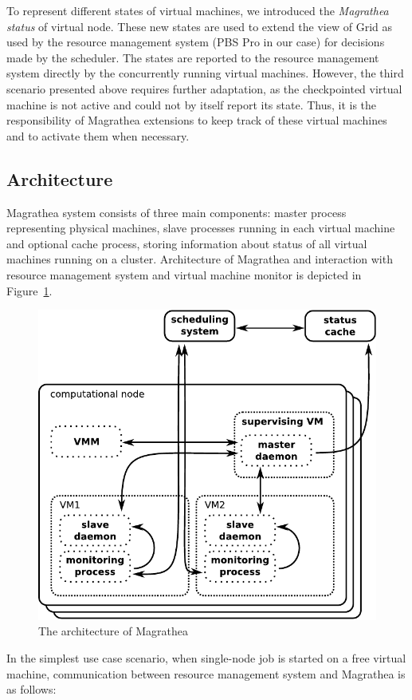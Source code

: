 \documentclass[a4paper]{article}
\begin{document}
To represent different states of virtual machines, we introduced the
\textit{Magrathea status} of virtual node. These new states are used to extend
the view of Grid as used by the resource management system (PBS Pro in our
case) for decisions made by the scheduler. The states are reported to the
resource management system directly by the concurrently running virtual
machines. However, the third scenario presented above requires further
adaptation, as the checkpointed virtual machine is not active and could not by
itself report its state. Thus, it is the responsibility of Magrathea
extensions to keep track of these virtual machines and to activate them when
necessary.

\subsection{Architecture} 

Magrathea system consists of three main components: master process
representing physical machines, slave processes running in each virtual
machine and optional cache process, storing information about status of all
virtual machines running on a cluster. Architecture of Magrathea and
interaction with resource management system and virtual machine monitor is
depicted in Figure~\ref{fig:architecture}.

\begin{figure}[tb]
    \begin{center}
    \includegraphics[width=.6\textwidth]{architecture}
    \end{center}
    \caption{The architecture of Magrathea}
    \label{fig:architecture}
\end{figure}

In the simplest use case scenario, when single-node job is started on a free
virtual machine, communication between resource management system and
Magrathea is as follows:
\end{document}
